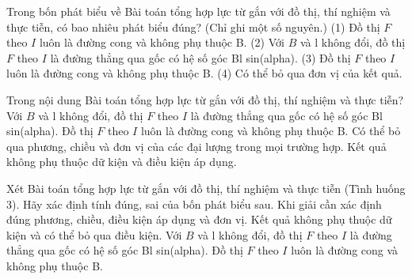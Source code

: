 \begin{ex}
Trong bốn phát biểu về Bài toán tổng hợp lực từ gắn với đồ thị, thí nghiệm và thực tiễn, có bao nhiêu phát biểu đúng? (Chỉ ghi một số nguyên.) (1) Đồ thị $F$ theo $I$ luôn là đường cong và không phụ thuộc B. (2) Với $B$ và l không đổi, đồ thị $F$ theo $I$ là đường thẳng qua gốc có hệ số góc Bl sin(alpha). (3) Đồ thị $F$ theo $I$ luôn là đường cong và không phụ thuộc B. (4) Có thể bỏ qua đơn vị của kết quả.
\end{ex}

\begin{ex}
Trong nội dung Bài toán tổng hợp lực từ gắn với đồ thị, thí nghiệm và thực tiễn?
\choice
{\True Với $B$ và l không đổi, đồ thị $F$ theo $I$ là đường thẳng qua gốc có hệ số góc Bl sin(alpha).}
{Đồ thị $F$ theo $I$ luôn là đường cong và không phụ thuộc B.}
{Có thể bỏ qua phương, chiều và đơn vị của các đại lượng trong mọi trường hợp.}
{Kết quả không phụ thuộc dữ kiện và điều kiện áp dụng.}
\end{ex}

\begin{ex}
Xét Bài toán tổng hợp lực từ gắn với đồ thị, thí nghiệm và thực tiễn (Tình huống 3). Hãy xác định tính đúng, sai của bốn phát biểu sau.
\choiceTF
{\True Khi giải cần xác định đúng phương, chiều, điều kiện áp dụng và đơn vị.}
{Kết quả không phụ thuộc dữ kiện và có thể bỏ qua điều kiện.}
{\True Với $B$ và l không đổi, đồ thị $F$ theo $I$ là đường thẳng qua gốc có hệ số góc Bl sin(alpha).}
{Đồ thị $F$ theo $I$ luôn là đường cong và không phụ thuộc B.}
\end{ex}

